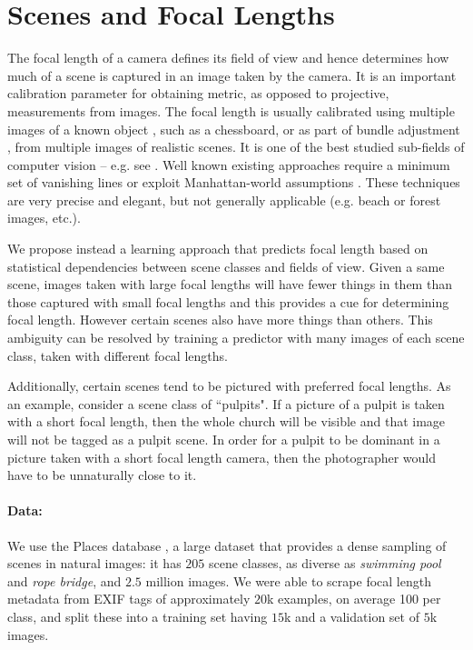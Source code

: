 \section{Scenes and Focal Lengths}
The focal length of a camera defines its field of view and hence determines how much of a scene is captured in an image taken by the camera. It is an important calibration parameter for obtaining metric, as opposed to projective, measurements from images. The focal length is usually calibrated using multiple images of a known object \cite{zhang2000flexible}, such as a chessboard, or as part of bundle adjustment \cite{triggs2000bundle}, from multiple images of realistic scenes. It is one of the best studied sub-fields of computer vision -- e.g. see \cite{Hartley2004}. Well known existing approaches require a minimum set of vanishing lines  \cite{wang1991camera} or exploit Manhattan-world assumptions \cite{caprile1990using}. These techniques are very precise and elegant, but not generally applicable (e.g. beach or forest images, etc.).

We propose instead a learning approach that predicts focal length based on statistical dependencies between scene classes and fields of view. Given a same scene, images taken with large focal lengths will have fewer things in them than those captured with small focal lengths and this provides a cue for determining focal length. However certain scenes also have more things than others. This ambiguity can be resolved by training a predictor with many images of each scene class, taken with different focal lengths. 

Additionally, certain scenes tend to be pictured with preferred focal lengths. As an example, consider a scene class of ``pulpits". If a picture of a pulpit is taken with a short focal length, then the whole church will be visible and that image will not be tagged as a pulpit scene. In order for a pulpit to be dominant in a picture taken with a short focal length camera, then the photographer would have to be unnaturally close to it. 

\paragraph{Data:} We use the Places database \cite{zhou2014learning}, a large dataset that provides a dense sampling of scenes in natural images: it has $205$ scene classes, as diverse as \textit{swimming pool} and \textit{rope bridge}, and $2.5$ million images. We were able to scrape focal length metadata from EXIF tags of approximately $20$k examples, on average 100 per class, and split these into a training set having $15$k and a validation set of $5$k images. 

